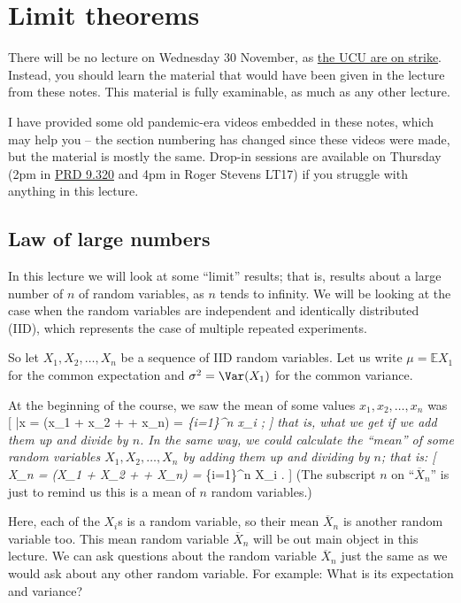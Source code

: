 \documentclass[
  letterpaper,
  DIV=11,
  numbers=noendperiod]{scrreprt}
\theoremstyle{remark}
\begin{document}
\hypertarget{L18-limit}{%
\chapter{Limit theorems}\label{L18-limit}}

There will be no lecture on Wednesday 30 November, as
\href{https://www.leedsucu.org.uk/information-for-students-2/}{the UCU
are on strike}. Instead, you should learn the material that would have
been given in the lecture from these notes. This material is fully
examinable, as much as any other lecture.

I have provided some old pandemic-era videos embedded in these notes,
which may help you -- the section numbering has changed since these
videos were made, but the material is mostly the same. Drop-in sessions
are available on Thursday (2pm in
\href{https://mpaldridge.github.io/office.html}{PRD 9.320} and 4pm in
Roger Stevens LT17) if you struggle with anything in this lecture.

\hypertarget{lln}{%
\section{Law of large numbers}\label{lln}}

In this lecture we will look at some ``limit'' results; that is, results
about a large number of \(n\) of random variables, as \(n\) tends to
infinity. We will be looking at the case when the random variables are
independent and identically distributed (IID), which represents the case
of multiple repeated experiments.

So let \(X_1, X_2, \dots, X_n\) be a sequence of IID random variables.
Let us write \(\mu = \mathbb EX_1\) for the common expectation and
\(\sigma^2 = \Var(X_1)\) for the common variance.

At the beginning of the course, we saw the mean of some values
\(x_1, x_2, \dots, x_n\) was {[} \bar x =  (x\_1 + x\_2 +
\cdots + x\_n) =  \sum\emph{\{i=1\}\^{}n x\_i ; {]} that is,
what we get if we add them up and divide by \(n\). In the same way, we
could calculate the ``mean'' of some random variables
\(X_1, X_2, \dots, X_n\) by adding them up and dividing by \(n\); that
is: {[} \overline X\_n =  (X\_1 + X\_2 + \cdots + X\_n) =
 \sum}\{i=1\}\^{}n X\_i . {]} (The subscript \(n\) on
``\(\overline X_n\)'' is just to remind us this is a mean of \(n\)
random variables.)

Here, each of the \(X_i\)s is a random variable, so their mean
\(\overline X_n\) is another random variable too. This mean random
variable \(\overline X_n\) will be out main object in this lecture. We
can ask questions about the random variable \(\overline X_n\) just the
same as we would ask about any other random variable. For example: What
is its expectation and variance?
\end{document}
